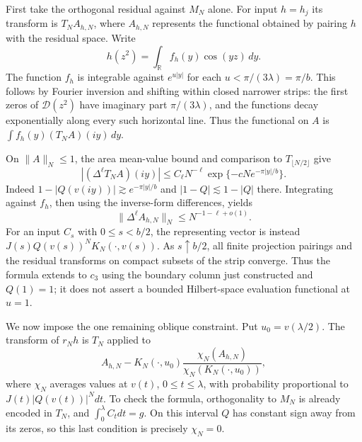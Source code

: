\documentclass[11pt]{article}
\numberwithin{equation}{section}
\theoremstyle{definition}\newtheorem{definition}[theorem]{Definition}
\theoremstyle{remark}\newtheorem{remark}[theorem]{Remark}
\begin{document}
First take the orthogonal residual against $M_N$ alone.  For input
$h=h_j$ its transform is $T_NA_{h,N}$, where $A_{h,N}$ represents the
functional obtained by pairing $h$ with the residual space.  Write
\[
 h(z^2)=\int_{\mathbb R}f_h(y)\cos(yz)\,dy.
\]
The function $f_h$ is integrable against $e^{u|y|}$ for each
$u<\pi/(3\lambda)=\pi/b$.  This follows by Fourier inversion and
shifting within closed narrower strips: the first zeros of
$\mathcal D(z^2)$ have imaginary part $\pi/(3\lambda)$, and the
functions decay exponentially along every such horizontal line.
Thus the functional on $A$ is
$\int f_h(y)(T_NA)(iy)\,dy$.

On $\|A\|_N\le1$, the area mean-value bound and comparison to
$T_{\lfloor N/2\rfloor}$ give
\[
 |(\Delta^\ell T_NA)(iy)|
 \le C_\ell N^{-\ell}
       \exp\{-cNe^{-\pi|y|/b}\}.
\]
Indeed $1-|Q(v(iy))|\gtrsim e^{-\pi|y|/b}$ and
$|1-Q|\lesssim1-|Q|$ there.  Integrating against $f_h$, then using
the inverse-form differences, yields
\begin{equation}\label{c:h-vector-bound}
 \|\Delta^\ell A_{h,N}\|_N\le N^{-1-\ell+o(1)}.
\end{equation}
For an input $C_s$ with $0\le s<b/2$, the representing vector is
instead $J(s)Q(v(s))^NK_N(\cdot,v(s))$.  As $s\uparrow b/2$, all
finite projection pairings and the residual transforms on compact
subsets of the strip converge.  Thus the formula extends to $c_3$
using the boundary column just constructed and $Q(1)=1$; it does not
assert a bounded Hilbert-space evaluation functional at $u=1$.

We now impose the one remaining oblique constraint.  Put
$u_0=v(\lambda/2)$.  The transform of $r_Nh$ is $T_N$ applied to
\begin{equation}\label{c:oblique-vector}
 A_{h,N}-K_N(\cdot,u_0)
       \frac{\chi_N(A_{h,N})}{\chi_N(K_N(\cdot,u_0))},
\end{equation}
where $\chi_N$ averages values at $v(t)$, $0\le t\le\lambda$,
with probability proportional to $J(t)|Q(v(t))|^Ndt$.
To check the formula, orthogonality to $M_N$ is already encoded in
$T_N$, and $\int_0^\lambda C_tdt=g$.  On this interval $Q$ has
constant sign away from its zeros, so this last condition is precisely
$\chi_N=0$.
\end{document}
